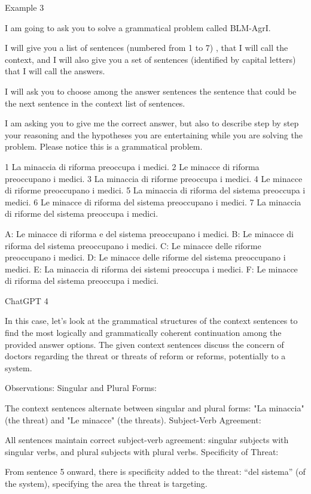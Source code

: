 Example 3

I am going to ask you to solve a grammatical problem called BLM-AgrI.  

I will give you a list of sentences (numbered from 1 to 7) , that I will call the context, and I will also give you a set of sentences (identified by capital letters) that I will call  the answers. 

I will ask you to choose among the answer sentences the sentence that could be the next sentence in the context list of sentences.

I am asking you to give me the correct answer, but also to describe step by step  your reasoning and the hypotheses you are entertaining while you are solving the problem. Please notice this is a grammatical problem.

1 La minaccia di riforma preoccupa i medici.
2 Le minacce di riforma preoccupano i medici.
3 La minaccia di riforme preoccupa i medici.
4 Le minacce di riforme preoccupano i medici.
5 La minaccia di riforma del sistema preoccupa i medici.
6 Le minacce di riforma del sistema preoccupano i medici.
7 La minaccia di riforme del sistema preoccupa i medici.


A: Le minacce di riforma e del sistema preoccupano i medici.
B: Le minacce di riforma del sistema preoccupano i medici.
C: Le minacce delle riforme preoccupano i medici.
D: Le minacce delle riforme del sistema preoccupano i medici.
E: La minaccia di riforma dei sistemi preoccupa i medici.
F: Le minacce di riforma del sistema preoccupa i medici.


ChatGPT 4

In this case, let’s look at the grammatical structures of the context sentences to find the most logically and grammatically coherent continuation among the provided answer options. The given context sentences discuss the concern of doctors regarding the threat or threats of reform or reforms, potentially to a system.

Observations:
Singular and Plural Forms:

The context sentences alternate between singular and plural forms: "La minaccia" (the threat) and "Le minacce" (the threats).
Subject-Verb Agreement:

All sentences maintain correct subject-verb agreement: singular subjects with singular verbs, and plural subjects with plural verbs.
Specificity of Threat:

From sentence 5 onward, there is specificity added to the threat: “del sistema” (of the system), specifying the area the threat is targeting.

